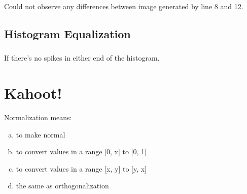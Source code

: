 \inputminted[linenos=true]{octave}{../code/exercise04-1.m}

Could not observe any differences between image generated by line 8 and 12.

\subsection{Histogram Equalization}
\subsubsection{}
If there's no spikes in either end of the histogram.

\subsubsection{}

\section{Kahoot!}

Normalization means:
\begin{enumerate}[(a)]
    \item to make normal
    \item to convert values in a range [0, x] to [0, 1]
    \item to convert values in a range [x, y] to [y, x]
    \item the same as orthogonalization
\end{enumerate}


